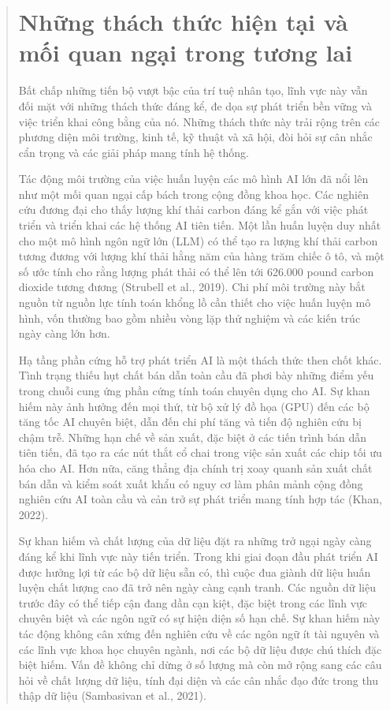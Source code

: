 \begin{quote}
\section{Những thách thức hiện tại và mối quan ngại trong tương lai}

Bất chấp những tiến bộ vượt bậc của trí tuệ nhân tạo, lĩnh vực này vẫn đối mặt với những thách thức đáng kể, đe dọa sự phát triển bền vững và việc triển khai công bằng của nó. Những thách thức này trải rộng trên các phương diện môi trường, kinh tế, kỹ thuật và xã hội, đòi hỏi sự cân nhắc cẩn trọng và các giải pháp mang tính hệ thống.

Tác động môi trường của việc huấn luyện các mô hình AI lớn đã nổi lên như một mối quan ngại cấp bách trong cộng đồng khoa học. Các nghiên cứu đương đại cho thấy lượng khí thải carbon đáng kể gắn với việc phát triển và triển khai các hệ thống AI tiên tiến. Một lần huấn luyện duy nhất cho một mô hình ngôn ngữ lớn (LLM) có thể tạo ra lượng khí thải carbon tương đương với lượng khí thải hằng năm của hàng trăm chiếc ô tô, và một số ước tính cho rằng lượng phát thải có thể lên tới 626.000 pound carbon dioxide tương đương (Strubell et al., 2019). Chi phí môi trường này bắt nguồn từ nguồn lực tính toán khổng lồ cần thiết cho việc huấn luyện mô hình, vốn thường bao gồm nhiều vòng lặp thử nghiệm và các kiến trúc ngày càng lớn hơn.

Hạ tầng phần cứng hỗ trợ phát triển AI là một thách thức then chốt khác. Tình trạng thiếu hụt chất bán dẫn toàn cầu đã phơi bày những điểm yếu trong chuỗi cung ứng phần cứng tính toán chuyên dụng cho AI. Sự khan hiếm này ảnh hưởng đến mọi thứ, từ bộ xử lý đồ họa (GPU) đến các bộ tăng tốc AI chuyên biệt, dẫn đến chi phí tăng và tiến độ nghiên cứu bị chậm trễ. Những hạn chế về sản xuất, đặc biệt ở các tiến trình bán dẫn tiên tiến, đã tạo ra các nút thắt cổ chai trong việc sản xuất các chip tối ưu hóa cho AI. Hơn nữa, căng thẳng địa chính trị xoay quanh sản xuất chất bán dẫn và kiểm soát xuất khẩu có nguy cơ làm phân mảnh cộng đồng nghiên cứu AI toàn cầu và cản trở sự phát triển mang tính hợp tác (Khan, 2022).

Sự khan hiếm và chất lượng của dữ liệu đặt ra những trở ngại ngày càng đáng kể khi lĩnh vực này tiến triển. Trong khi giai đoạn đầu phát triển AI được hưởng lợi từ các bộ dữ liệu sẵn có, thì cuộc đua giành dữ liệu huấn luyện chất lượng cao đã trở nên ngày càng cạnh tranh. Các nguồn dữ liệu trước đây có thể tiếp cận đang dần cạn kiệt, đặc biệt trong các lĩnh vực chuyên biệt và các ngôn ngữ có sự hiện diện số hạn chế. Sự khan hiếm này tác động không cân xứng đến nghiên cứu về các ngôn ngữ ít tài nguyên và các lĩnh vực khoa học chuyên ngành, nơi các bộ dữ liệu được chú thích đặc biệt hiếm. Vấn đề không chỉ dừng ở số lượng mà còn mở rộng sang các câu hỏi về chất lượng dữ liệu, tính đại diện và các cân nhắc đạo đức trong thu thập dữ liệu (Sambasivan et al., 2021).


\end{quote}
